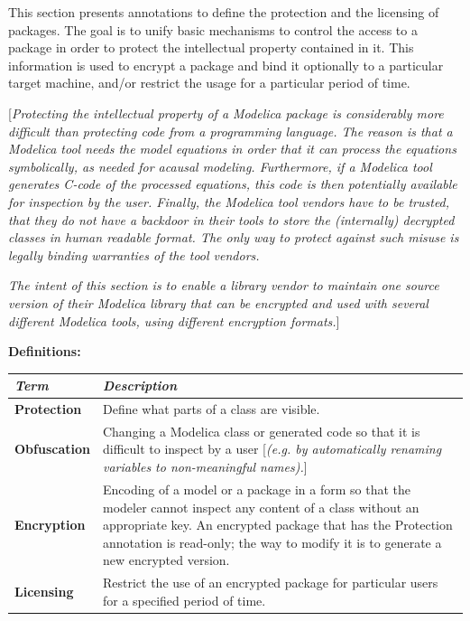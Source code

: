\documentclass[10pt,a4paper]{report}
\begin{document}
This section presents annotations to define the protection and the
licensing of packages. The goal is to unify basic mechanisms to control
the access to a package in order to protect the intellectual property
contained in it. This information is used to encrypt a package and bind
it optionally to a particular target machine, and/or restrict the usage
for a particular period of time.

{[}\emph{Protecting the intellectual property of a Modelica package is
considerably more difficult than protecting code from a programming
language. The reason is that a Modelica tool needs the model equations
in order that it can process the equations symbolically, as needed for
acausal modeling. Furthermore, if a Modelica tool generates C-code of
the processed equations, this code is then potentially available for
inspection by the user. Finally, the Modelica tool vendors have to be
trusted, that they do not have a backdoor in their tools to store the
(internally) decrypted classes in human readable format. The only way to
protect against such misuse is legally binding warranties of the tool
vendors. }

\emph{The intent of this section is to enable a library vendor to
maintain one source version of their Modelica library that can be
encrypted and used with several different Modelica tools, using
different encryption formats.}{]}

\textbf{Definitions:}

\begin{longtable}[]{|p{2cm}|p{12cm}|}
\hline
\emph{Term} & \emph{Description}\\ \hline
\endhead
\textbf{Protection} & Define what parts of a class are
visible.\\ \hline
\textbf{Obfuscation} & Changing a Modelica class or generated code so
that it is difficult to inspect by a user {[}\emph{(e.g. by
automatically renaming variables to non-meaningful
names).}{]}\\ \hline
\textbf{Encryption} & Encoding of a model or a package in a form so that
the modeler cannot inspect any content of a class without an appropriate
key. An encrypted package that has the Protection annotation is
read-only; the way to modify it is to generate a new encrypted
version.\\ \hline
\textbf{Licensing} & Restrict the use of an encrypted package for
particular users for a specified period of time.\\ \hline

\end{longtable}
\end{document}
